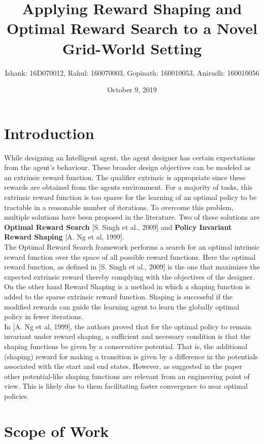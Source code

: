 \documentclass[11pt]{article}
\title{\textbf{Applying Reward Shaping and Optimal Reward Search to a Novel Grid-World Setting}}
\author{Ishank: 16D070012, Rahul: 160070003, Gopinath: 160010053, Anirudh: 160010056}
\begin{document}
\date{October 9, 2019}	%
\maketitle

\section{Introduction}

While designing an Intelligent agent, the agent designer has certain expectations from the agent’s behaviour. These broader design objectives can be modeled as an extrinsic reward function. The qualifier extrinsic is appropriate since these rewards are obtained from the agents environment. For a majority of tasks, this extrinsic reward function is too sparse for the learning of an optimal policy to be tractable in a reasonable number of iterations. To overcome this problem, multiple solutions have been proposed in the literature. Two of these solutions are \textbf{Optimal Reward Search} [S. Singh et al., 2009] and \textbf{Policy Invariant Reward Shaping} [A. Ng et al, 1999].\\
The Optimal Reward Search framework performs a search for an optimal intrinsic reward function over the space of all possible reward functions. Here the optimal reward function, as defined in [S. Singh et al., 2009] is the one that maximizes the expected extrinsic reward thereby complying with the objectives of the designer.\\ 
On the other hand Reward Shaping is a method in which a shaping function is added to the sparse extrinsic reward function. Shaping is successful if the modified rewards can guide the learning agent to learn the globally optimal policy in fewer iterations.\\
In [A. Ng et al, 1999], the authors proved that for the optimal policy to remain invariant under reward shaping, a sufficient and necessary condition is that the shaping functions be given by a conservative potential. That is, the additional (shaping) reward for making a transition is given by a difference in the potentials associated with the start and end states. However, as suggested in the paper other potential-like shaping functions are relevant from an engineering point of view. This is likely due to them facilitating faster convergence to near optimal policies.

\section{Scope of Work}
\end{document}
